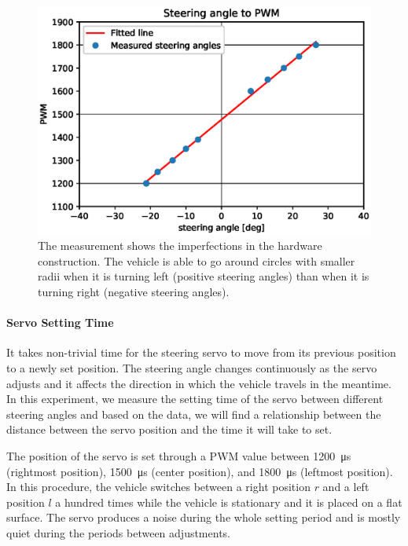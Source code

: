 \begin{figure}[b]
	\includegraphics[width=\textwidth]{../img/steering_angle_to_pwm}
	\caption{The measurement shows the imperfections in the hardware construction. The vehicle is able to go around circles with smaller radii when it is turning left (positive steering angles) than when it is turning right (negative steering angles).}
	\label{fig:steering_angle_to_pwm}
\end{figure}

\paragraph{Servo Setting Time}

It takes non-trivial time for the steering servo to move from its previous position to a newly set position. The steering angle changes continuously as the servo adjusts and it affects the direction in which the vehicle travels in the meantime. In this experiment, we measure the setting time of the servo between different steering angles and based on the data, we will find a relationship between the distance between the servo position and the time it will take to set.

The position of the servo is set through a \gls{PWM} value between \SI{1200}{\micro\second} (rightmost position), \SI{1500}{\micro\second} (center position), and \SI{1800}{\micro\second} (leftmost position). In this procedure, the vehicle switches between a right position $r$ and a left position $l$ a hundred times while the vehicle is stationary and it is placed on a flat surface. The servo produces a noise during the whole setting period and is mostly quiet during the periods between adjustments.

